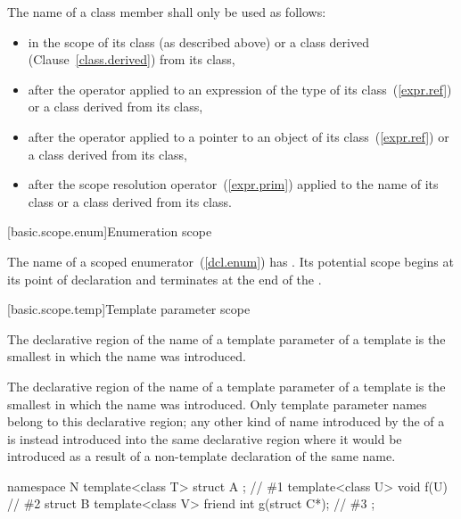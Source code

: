 \pnum
The name of a class member shall only be used as follows:

\begin{itemize}
\item in the scope of its class (as described above) or a class derived
(Clause~\ref{class.derived}) from its class,
\item after the  operator applied to an expression of the type
of its class~(\ref{expr.ref}) or a class derived from its class,
\item after the \tcode{->} operator applied to a pointer to an object of
its class~(\ref{expr.ref}) or a class derived from its class,
\item after the \tcode{::} scope resolution operator~(\ref{expr.prim})
applied to the name of its class or a class derived from its class.
\end{itemize}

[basic.scope.enum]{Enumeration scope}%
%

\pnum
The name of a scoped enumerator~(\ref{dcl.enum}) has
. Its potential scope begins at
its point of declaration and terminates at the end of the
.

[basic.scope.temp]{Template parameter scope}%
%
%

\pnum
The declarative region of the name of a template parameter of a template
 is the smallest 
in which the name was introduced.

\pnum
The declarative region of the name of a template parameter of a template is the smallest
 in which the name was introduced. Only template
parameter names belong to this declarative region; any other kind of name introduced by
the  of a  is instead
introduced into the same declarative region where it would be introduced as a result of
a non-template declaration of the same name. \enterexample

\begin{codeblock}
namespace N {
  template<class T> struct A { };               // \#1
  template<class U> void f(U) { }               // \#2
  struct B {
    template<class V> friend int g(struct C*);  // \#3
  };
}
\end{codeblock}

